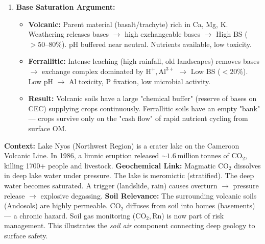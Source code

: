 \documentclass[11pt]{article}
\begin{document}
\begin{corrige}
\begin{enumerate}
\begin{itemize}
            \item \textbf{K (10\% = 20 kg $\mathrm{K_2O}$ $\approx$ 16.6 kg K):} Low CEC ($3\ \mathrm{cmol_c/kg}$) saturated with $\mathrm{Al/H}$ $\to$ $\mathrm{K^+}$ cannot be held $\to$ leaches rapidly with high rainfall. Very low recovery.
        \end{itemize}
        \textbf{Conclusion:} Waste of money. Lime first.
    \item \textbf{Base Saturation Argument:}
        \begin{itemize}
            \item \textbf{Volcanic:} Parent material (basalt/trachyte) rich in Ca, Mg, K. Weathering releases bases $\to$ high exchangeable bases $\to$ High BS ($> 50\text{--}80\%$). pH buffered near neutral. Nutrients available, low toxicity.
            \item \textbf{Ferrallitic:} Intense leaching (high rainfall, old landscapes) removes bases $\to$ exchange complex dominated by $\mathrm{H^+}, \mathrm{Al^{3+}}$ $\to$ Low BS ($< 20\%$). Low pH $\to$ Al toxicity, P fixation, low microbial activity.
            \item \textbf{Result:} Volcanic soils have a large "chemical buffer" (reserve of bases on CEC) supplying crops continuously. Ferrallitic soils have an empty "bank" — crops survive only on the "cash flow" of rapid nutrient cycling from surface OM.
        \end{itemize}
\end{enumerate}
\end{corrige}

\begin{experience}
\textbf{Context:} Lake Nyos (Northwest Region) is a crater lake on the Cameroon Volcanic Line. In 1986, a limnic eruption released $\sim 1.6\ \mathrm{million\ tonnes}$ of $\mathrm{CO_2}$, killing 1700+ people and livestock.
\textbf{Geochemical Link:} Magmatic $\mathrm{CO_2}$ dissolves in deep lake water under pressure. The lake is meromictic (stratified). The deep water becomes saturated. A trigger (landslide, rain) causes overturn $\to$ pressure release $\to$ explosive degassing.
\textbf{Soil Relevance:} The surrounding volcanic soils (Andosols) are highly permeable. $\mathrm{CO_2}$ diffuses from soil into homes (basements) — a chronic hazard. Soil gas monitoring ($\mathrm{CO_2}, \mathrm{Rn}$) is now part of risk management. This illustrates the \emph{soil air} component connecting deep geology to surface safety.
\end{experience}
\end{document}
